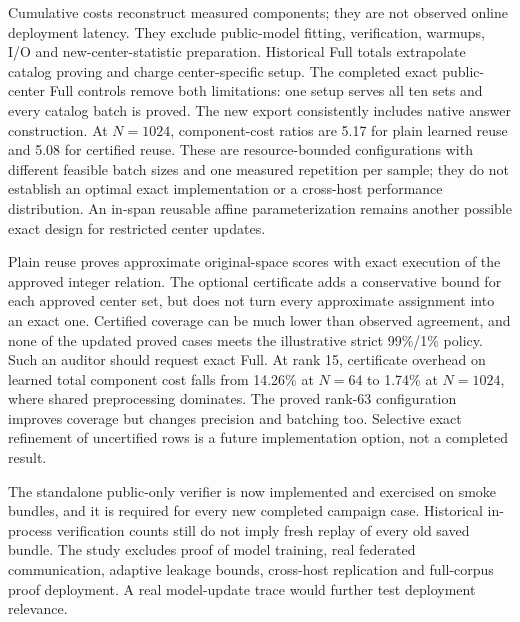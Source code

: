 Cumulative costs reconstruct measured components; they are not observed online deployment latency. They exclude public-model fitting, verification, warmups, I/O and new-center-statistic preparation. Historical Full totals extrapolate catalog proving and charge center-specific setup. The completed exact public-center Full controls remove both limitations: one setup serves all ten sets and every catalog batch is proved. The new export consistently includes native answer construction. At $N=1024$, component-cost ratios are 5.17 for plain learned reuse and 5.08 for certified reuse. These are resource-bounded configurations with different feasible batch sizes and one measured repetition per sample; they do not establish an optimal exact implementation or a cross-host performance distribution. An in-span reusable affine parameterization remains another possible exact design for restricted center updates.

Plain reuse proves approximate original-space scores with exact execution of the approved integer relation. The optional certificate adds a conservative bound for each approved center set, but does not turn every approximate assignment into an exact one. Certified coverage can be much lower than observed agreement, and none of the updated proved cases meets the illustrative strict 99\%/1\% policy. Such an auditor should request exact Full. At rank 15, certificate overhead on learned total component cost falls from 14.26\% at $N=64$ to 1.74\% at $N=1024$, where shared preprocessing dominates. The proved rank-63 configuration improves coverage but changes precision and batching too. Selective exact refinement of uncertified rows is a future implementation option, not a completed result.

The standalone public-only verifier is now implemented and exercised on smoke bundles, and it is required for every new completed campaign case. Historical in-process verification counts still do not imply fresh replay of every old saved bundle. The study excludes proof of model training, real federated communication, adaptive leakage bounds, cross-host replication and full-corpus proof deployment. A real model-update trace would further test deployment relevance.

